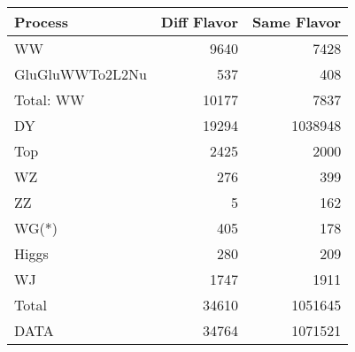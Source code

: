 \begin{table}[ht]
	\centering
\begin{tabular}{lrr}

         Process &  Diff Flavor &  Same Flavor \\
		\hline
              WW &         9640 &         7428 \\
 GluGluWWTo2L2Nu &          537 &          408 \\
\hline
       Total: WW &        10177 &         7837 \\
              DY &        19294 &      1038948 \\
             Top &         2425 &         2000 \\
              WZ &          276 &          399 \\
              ZZ &            5 &          162 \\
           WG(*) &          405 &          178 \\
           Higgs &          280 &          209 \\
              WJ &         1747 &         1911 \\
\hline
           Total &        34610 &      1051645 \\
            DATA &        34764 &      1071521 \\


\end{tabular}

\end{table}